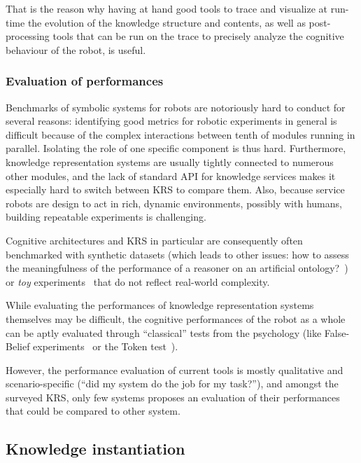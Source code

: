 That is the reason why having at hand good tools to trace and visualize at
run-time the evolution of the knowledge structure and contents, as well as
post-processing tools that can be run on the trace to precisely analyze the
cognitive behaviour of the robot, is useful.

\subsubsection{Evaluation of performances}
\label{sect|performances}

Benchmarks of symbolic systems for robots are notoriously hard to conduct for
several reasons: identifying good metrics for robotic experiments in general is
difficult because of the complex interactions between tenth of modules running
in parallel. Isolating the role of one specific component is thus hard.
Furthermore, knowledge representation systems are usually tightly connected to
numerous other modules, and the lack of standard API for knowledge services
makes it especially hard to switch between KRS to compare them. Also, because
service robots are design to act in rich, dynamic environments, possibly with
humans, building repeatable experiments is challenging.

Cognitive architectures and KRS in particular are consequently often
benchmarked with synthetic datasets (which leads to other issues: how to assess
the meaningfulness of the performance of a reasoner on an artificial
ontology?~\cite{Bail2010}) or \emph{toy} experiments~\cite{Chong2009} that do
not reflect real-world complexity.

While evaluating the performances of knowledge representation systems
themselves may be difficult, the cognitive performances of the robot as a whole
can be aptly evaluated through ``classical'' tests from the psychology (like
False-Belief experiments~\cite{Leslie2000} or the Token
test~\cite{DiSimoni1978}).

However, the performance evaluation of current tools is mostly qualitative and
scenario-specific (``did my system do the job for my task?''), and amongst the
surveyed KRS, only few systems proposes an evaluation of their performances
that could be compared to other system.

\subsection{Knowledge instantiation}

